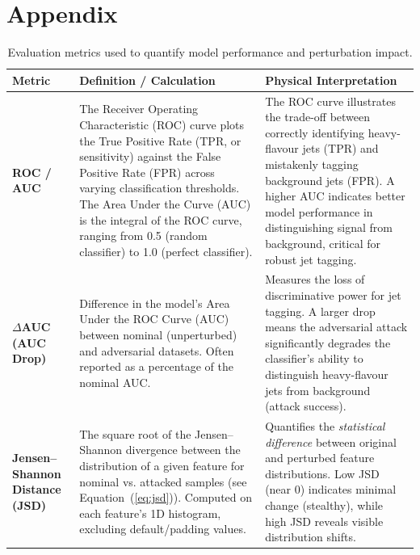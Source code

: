 \documentclass[12pt]{caltech_thesis}
\begin{document}
\chapter{Appendix}

\begin{table}[ht]
\centering
\caption{Evaluation metrics used to quantify model performance and perturbation impact.}
\begin{tabularx}{\textwidth}{@{} l X X @{}}
\toprule
\textbf{Metric} & \textbf{Definition / Calculation} & \textbf{Physical Interpretation} \\
\midrule
\textbf{ROC / AUC} &
The Receiver Operating Characteristic (ROC) curve plots the True Positive Rate (TPR, or sensitivity) against the False Positive Rate (FPR) across varying classification thresholds. The Area Under the Curve (AUC) is the integral of the ROC curve, ranging from 0.5 (random classifier) to 1.0 (perfect classifier). &
The ROC curve illustrates the trade-off between correctly identifying heavy-flavour jets (TPR) and mistakenly tagging background jets (FPR). A higher AUC indicates better model performance in distinguishing signal from background, critical for robust jet tagging. \\
\addlinespace
\textbf{\(\Delta\)AUC (AUC Drop)} &
Difference in the model’s Area Under the ROC Curve (AUC) between nominal (unperturbed) and adversarial datasets. Often reported as a percentage of the nominal AUC. &
Measures the loss of discriminative power for jet tagging. A larger drop means the adversarial attack significantly degrades the classifier’s ability to distinguish heavy-flavour jets from background (attack success). \\
\addlinespace
\textbf{Jensen–Shannon Distance (JSD)} &
The square root of the Jensen–Shannon divergence between the distribution of a given feature for nominal vs. attacked samples (see Equation~(\ref{eq:jsd})). Computed on each feature’s 1D histogram, excluding default/padding values. &
Quantifies the \emph{statistical difference} between original and perturbed feature distributions. Low JSD (near 0) indicates minimal change (stealthy), while high JSD reveals visible distribution shifts. \\
\hline
\end{tabularx}
\label{tab:evaluation_metrics}
\end{table}
\end{document}
